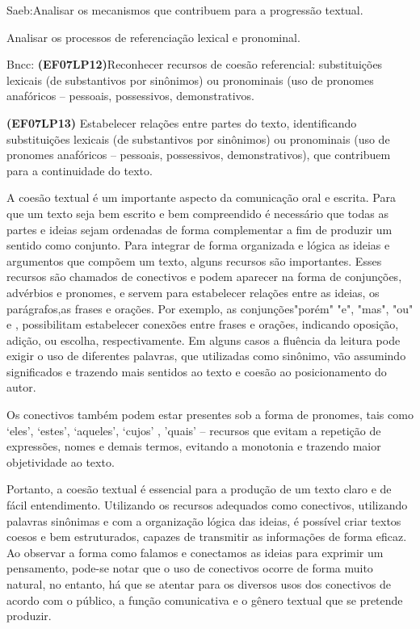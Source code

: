 {Saeb:Analisar os mecanismos que contribuem para a progressão textual.

Analisar os processos de referenciação lexical e pronominal.

Bncc: \textbf{(EF07LP12)}Reconhecer recursos de coesão referencial:
substituições lexicais (de substantivos por sinônimos) ou pronominais
(uso de pronomes anafóricos -- pessoais, possessivos, demonstrativos.

\textbf{(EF07LP13)} Estabelecer relações entre partes do texto,
identificando substituições lexicais (de substantivos por sinônimos) ou
pronominais (uso de pronomes anafóricos -- pessoais, possessivos,
demonstrativos), que contribuem para a continuidade do texto.

A coesão textual é um importante aspecto da comunicação oral e escrita.
Para que um texto seja bem escrito e bem compreendido é necessário que
todas as partes e ideias sejam ordenadas de forma complementar a fim de
produzir um sentido como conjunto. Para integrar de forma organizada e
lógica as ideias e argumentos que compõem um texto, alguns recursos são
importantes. Esses recursos são chamados de conectivos e podem aparecer
na forma de conjunções, advérbios e pronomes, e servem para estabelecer
relações entre as ideias, os parágrafos,as frases e orações. Por
exemplo, as conjunções"porém" "e", "mas", "ou" e , possibilitam
estabelecer conexões entre frases e orações, indicando oposição, adição,
ou escolha, respectivamente. Em alguns casos a fluência da leitura pode
exigir o uso de diferentes palavras, que utilizadas como sinônimo, vão
assumindo significados e trazendo mais sentidos ao texto e coesão ao
posicionamento do autor.

Os conectivos também podem estar presentes sob a forma de pronomes, tais
como `eles', `estes', `aqueles', `cujos' , 'quais' -- recursos que
evitam a repetição de expressões, nomes e demais termos, evitando a
monotonia e trazendo maior objetividade ao texto.

Portanto, a coesão textual é essencial para a produção de um texto claro
e de fácil entendimento. Utilizando os recursos adequados como
conectivos, utilizando palavras sinônimas e com a organização lógica das
ideias, é possível criar textos coesos e bem estruturados, capazes de
transmitir as informações de forma eficaz. Ao observar a forma como
falamos e conectamos as ideias para exprimir um pensamento, pode-se
notar que o uso de conectivos ocorre de forma muito natural, no entanto,
há que se atentar para os diversos usos dos conectivos de acordo com o
público, a função comunicativa e o gênero textual que se pretende
produzir.

}
